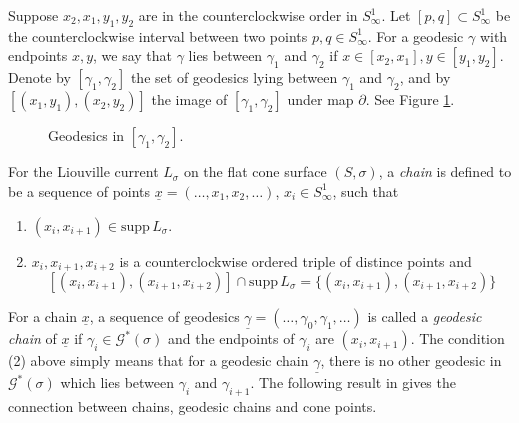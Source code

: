 \documentclass[reqno]{amsart}
\theoremstyle{plain}
\theoremstyle{definition}
\theoremstyle{remark}
\theoremstyle{definition}
\newcommand{\?}{\textcolor{red}{?}}
\newcommand{\Gssigma}{\mathcal{G}^*(\sigma) }
\newcommand{\supp}{\mathrm{supp}\, L_\sigma}
\begin{document}
Suppose $x_2,x_1,y_1,y_2$ are in the counterclockwise order in $S^1_\infty$. Let $[p,q]\subset S^1_\infty$ be the counterclockwise interval between two points $p,q\in S^1_\infty$. For a geodesic $\gamma$ with endpoints $x,y$, we say that $\gamma$ lies between $\gamma_1$ and $\gamma_2$ if $x\in[x_2,x_1],y\in[y_1,y_2]$. Denote by $[\gamma_1, \gamma_2]$ the set of geodesics lying between $\gamma_1$ and $\gamma_2$, and by $[(x_1,y_1),(x_2,y_2)]$ the image of $[\gamma_1,\gamma_2]$ under map $\partial$. See Figure \ref{lie between}.
\begin{figure}[h]
    \centering
    \caption{Geodesics in $[\gamma_1,\gamma_2]$.}
    \label{lie between}
\end{figure}

For the Liouville current $L_\sigma$ on the flat cone surface $(S,\sigma)$, a \textit{chain} is defined to be a sequence of points $\underline{x} = (\ldots, x_1,x_2,\ldots)$, $x_i\in S^1_\infty$, such that
\begin{enumerate}
    \item[(1)] $(x_i, x_{i+1})\in \supp$.
    \item[(2)] $x_i,x_{i+1},x_{i+2}$ is a counterclockwise ordered triple of distince points and 
    \[[(x_i,x_{i+1}),(x_{i+1},x_{i+2})]\cap \supp = \{(x_i,x_{i+1}), (x_{i+1},x_{i+2})\}\]
\end{enumerate}

For a chain $\underline{x}$, a sequence of geodesics $\underline{\gamma}=(\ldots,\gamma_0,\gamma_1,\ldots)$ is called a \textit{geodesic chain} of $\underline{x}$ if $\gamma_i\in\Gssigma$ and the endpoints of $\gamma_i$ are $(x_i,x_{i+1})$. The condition (2) above simply means that for a geodesic chain $\underline{\gamma}$, there is no other geodesic in $\Gssigma$ which lies between $\gamma_i$ and $\gamma_{i+1}$. The following result in \cite[Prop 4.1]{bankovic2018marked} gives the connection between chains, geodesic chains and cone points.
\end{document}
